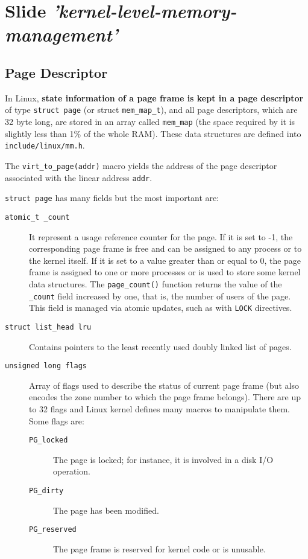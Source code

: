 \documentclass[10pt,a4paper]{article}
\begin{document}
\newpage
\section{Slide \textit{'kernel-level-memory-management'}}

\subsection{Page Descriptor}

In Linux, \textbf{state information of a page frame is kept in a page descriptor} of type \texttt{struct page} (or struct \texttt{mem\_map\_t}), and all page descriptors, which are 32 byte long, are stored in an array called \texttt{mem\_map} (the space required by it is slightly less than 1\% of the whole RAM). These data structures are defined into \texttt{include/linux/mm.h}. 

The \texttt{virt\_to\_page(addr)} macro yields the address of the page descriptor associated with the linear address \texttt{addr}. 

\texttt{struct page} has many fields but the most important are:
\begin{description}

\item[\texttt{atomic\_t \_count}] It represent a usage reference counter for the page. If it is set to -1, the corresponding page frame is free and can be assigned to any process or to the kernel itself. If it is set to a value greater than or equal to 0, the page frame is assigned to one or more processes or is used to store some kernel data structures. The \texttt{page\_count()} function returns the value of the \texttt{\_count} field increased by one, that is, the number of users of the page. This field is managed via atomic updates, such as with \texttt{LOCK} directives.
\item[\texttt{struct list\_head lru}] Contains pointers to the least recently used doubly linked list of pages. 
\item[\texttt{unsigned long flags}] Array of flags used to describe the status of current page frame (but also encodes the zone number to which the page frame belongs). There are up to 32 flags and Linux kernel defines many macros to manipulate them. Some flags are:
\begin{description}
\item[\texttt{PG\_locked}] The page is locked; for instance, it is involved in a disk I/O operation.
\item[\texttt{PG\_dirty}] The page has been modified.
\item[\texttt{PG\_reserved}] The page frame is reserved for kernel code or is unusable.
\end{description}

\end{description}
\end{document}
